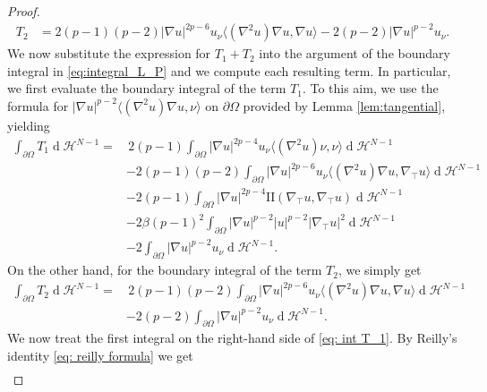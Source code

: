 \documentclass[10pt,a4paper, reqno]{amsart}
\numberwithin{equation}{section}
\renewcommand{\d}[1]{\ensuremath{\operatorname{d}\!{#1}}}
\begin{document}
\begin{proof}
\begin{equation*}
\begin{aligned}
        T_2 &= 2(p-1)(p-2)|\nabla u|^{2p-6} u_\nu \langle (\nabla^2 u)\nabla u, \nabla u \rangle - 2(p-2) |\nabla u|^{p-2} u_\nu.
        \end{aligned}
    \end{equation*}
    We now substitute the expression for $T_1+T_2$ into the argument of the boundary integral in \eqref{eq:integral_L_P} and we compute each resulting term. In particular, we first evaluate the boundary integral of the term $T_1$. To this aim, we use the formula for $|\nabla u|^{p-2}\langle(\nabla^2u)\nabla u,\nu\rangle$ on $\partial\Omega$ provided by Lemma \ref{lem:tangential}, yielding
    \begin{equation}\label{eq: int T_1}
        \begin{aligned}
            \int_{\partial\Omega} T_1 \d{}\mathcal{H}^{N-1} =& \,2(p-1)\int_{\partial\Omega}|\nabla u|^{2p-4} u_\nu \langle(\nabla^2u)\nu,\nu\rangle\d{}\mathcal{H}^{N-1}\\
            &-2(p-1)(p-2)\int_{\partial\Omega}|\nabla u|^{2p-6} u_\nu \langle(\nabla^2u)\nabla u,\nabla_\top u\rangle\d{}\mathcal{H}^{N-1}\\
            &-2(p-1)\int_{\partial\Omega}|\nabla u|^{2p-4} \mathrm{I\!I}(\nabla_\top u,\nabla_\top u) \d{}\mathcal{H}^{N-1}\\
            &-2\beta(p-1)^2\int_{\partial\Omega}|\nabla u|^{p-2}|u|^{p-2}|\nabla_\top u|^{2}\d{}\mathcal{H}^{N-1}\\
            &-2\int_{\partial\Omega}|\nabla u|^{p-2} u_\nu \d{}\mathcal{H}^{N-1}.
        \end{aligned}
    \end{equation}
    On the other hand, for the boundary integral of the term $T_2$, we simply get
    \begin{equation}\label{eq: int T_2}
        \begin{aligned}
        \int_{\partial\Omega} T_2 \d{}\mathcal{H}^{N-1} =
        & \, 2(p-1)(p-2)\int_{\partial\Omega}|\nabla u|^{2p-6} u_\nu \langle(\nabla^2u)\nabla u,\nabla u\rangle\d{}\mathcal{H}^{N-1}\\
        &-2(p-2)\int_{\partial\Omega}|\nabla u|^{p-2} u_\nu \d{}\mathcal{H}^{N-1}.
        \end{aligned}
    \end{equation}
    We now treat the first integral on the right-hand side of \eqref{eq: int T_1}. By Reilly's identity \eqref{eq: reilly formula} we get 
    \begin{equation*}
        \begin{aligned}

\end{aligned}
\end{equation*}
\end{proof}
\end{document}
